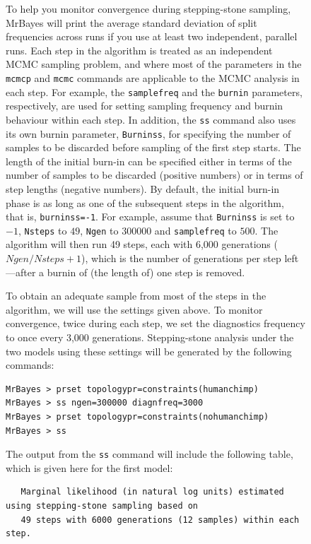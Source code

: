 \documentclass[12pt]{book}
\newcommand{\ttt}[1]{\texttt{#1}}
\begin{document}
\begin{figure}[h]
To help you monitor convergence during stepping-stone sampling, MrBayes will print the average
standard deviation of split frequencies across runs if you use at least two independent, parallel
runs. Each step in the algorithm is treated as an independent MCMC sampling problem, and where most
of the parameters in the \ttt{mcmcp} and \ttt{mcmc} commands are applicable to the MCMC analysis in
each step. For example, the \ttt{samplefreq} and the \ttt{burnin} parameters, respectively, are
used for setting sampling frequency and burnin behaviour within each step. In addition, the
\ttt{ss} command also uses its own burnin parameter, \ttt{Burninss}, for specifying the number of
samples to be discarded before sampling of the first step starts. The length of the initial burn-in
can be specified either in terms of the number of samples to be discarded (positive numbers) or in
terms of step lengths (negative numbers). By default, the initial burn-in phase is as long as one
of the subsequent steps in the algorithm, that is, \ttt{burninss=-1}. For example, assume that
\ttt{Burninss} is set to $-1$, \ttt{Nsteps} to $49$, \ttt{Ngen} to $300000$ and \ttt{samplefreq} to
$500$. The algorithm will then run 49 steps, each with 6,000 generations ($Ngen/Nsteps+1$), which
is the number of generations per step left---after a burnin of (the length of) one step is
removed.

To obtain an adequate sample from most of the steps in the algorithm, we will use the settings
given above. To monitor convergence, twice during each step, we set the diagnostics frequency to
once every 3,000 generations. Stepping-stone analysis under the two models using these settings
will be generated by the following commands:

\begin{singlespacing}
\small
\begin{verbatim}
MrBayes > prset topologypr=constraints(humanchimp)
MrBayes > ss ngen=300000 diagnfreq=3000
MrBayes > prset topologypr=constraints(nohumanchimp)
MrBayes > ss
\end{verbatim}
\end{singlespacing}
\normalsize

The output from the \ttt{ss} command will include the following table, which is given here for the
first model:

\scriptsize
\begin{singlespacing}
\begin{verbatim}
   Marginal likelihood (in natural log units) estimated using stepping-stone sampling based on
   49 steps with 6000 generations (12 samples) within each step. 


\end{verbatim}
\end{singlespacing}
\end{figure}
\end{document}

